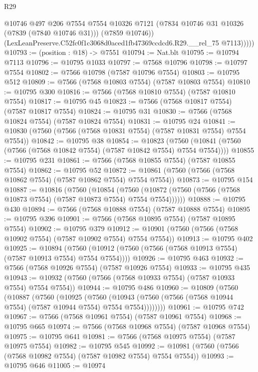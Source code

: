 \begin{lexlean}{R29}
\begin{coremodule}
              @10746
              @497
              @206
              @7554
              @7554
              @10326
              @7121
              (@7834 @10746 @31 @10326 (@7839 (@7840 @10746 @31)))
              (@7859 @10746))
            (LexLeanPreserve.C52fc0f1c3068d0aced1fb47369ccdcd6.R29.__rel_75 @7113)))))
@10793 := (position : @18) -> @7551
@10794 := Nat.blt
@10795 := @10794 @7113
@10796 := @10795 @1033
@10797 := @7568 @10796
@10798 := @10797 @7554
@10802 := @7566 @10798 (@7587 @10796 @7554)
@10803 := @10795 @512
@10809 := @7566 (@7568 @10803 @7554) (@7587 @10803 @7554)
@10810 := @10795 @300
@10816 := @7566 (@7568 @10810 @7554) (@7587 @10810 @7554)
@10817 := @10795 @45
@10823 := @7566 (@7568 @10817 @7554) (@7587 @10817 @7554)
@10824 := @10795 @31
@10830 := @7566 (@7568 @10824 @7554) (@7587 @10824 @7554)
@10831 := @10795 @24
@10841 := @10830 (@7560 (@7566 (@7568 @10831 @7554) (@7587 @10831 @7554) @7554 @7554))
@10842 := @10795 @38
@10854 := @10823
    (@7560 (@10841 (@7560 (@7566 (@7568 @10842 @7554) (@7587 @10842 @7554) @7554 @7554))))
@10855 := @10795 @231
@10861 := @7566 (@7568 @10855 @7554) (@7587 @10855 @7554)
@10862 := @10795 @52
@10872 := @10861 (@7560 (@7566 (@7568 @10862 @7554) (@7587 @10862 @7554) @7554 @7554))
@10873 := @10795 @154
@10887 := @10816
    (@7560
      (@10854
        (@7560 (@10872 (@7560 (@7566 (@7568 @10873 @7554) (@7587 @10873 @7554) @7554 @7554))))))
@10888 := @10795 @430
@10894 := @7566 (@7568 @10888 @7554) (@7587 @10888 @7554)
@10895 := @10795 @396
@10901 := @7566 (@7568 @10895 @7554) (@7587 @10895 @7554)
@10902 := @10795 @379
@10912 := @10901 (@7560 (@7566 (@7568 @10902 @7554) (@7587 @10902 @7554) @7554 @7554))
@10913 := @10795 @402
@10925 := @10894
    (@7560 (@10912 (@7560 (@7566 (@7568 @10913 @7554) (@7587 @10913 @7554) @7554 @7554))))
@10926 := @10795 @463
@10932 := @7566 (@7568 @10926 @7554) (@7587 @10926 @7554)
@10933 := @10795 @435
@10943 := @10932 (@7560 (@7566 (@7568 @10933 @7554) (@7587 @10933 @7554) @7554 @7554))
@10944 := @10795 @486
@10960 := @10809
    (@7560
      (@10887
        (@7560
          (@10925
            (@7560
              (@10943 (@7560 (@7566 (@7568 @10944 @7554) (@7587 @10944 @7554) @7554 @7554))))))))
@10961 := @10795 @742
@10967 := @7566 (@7568 @10961 @7554) (@7587 @10961 @7554)
@10968 := @10795 @665
@10974 := @7566 (@7568 @10968 @7554) (@7587 @10968 @7554)
@10975 := @10795 @641
@10981 := @7566 (@7568 @10975 @7554) (@7587 @10975 @7554)
@10982 := @10795 @545
@10992 := @10981 (@7560 (@7566 (@7568 @10982 @7554) (@7587 @10982 @7554) @7554 @7554))
@10993 := @10795 @646
@11005 := @10974

\end{coremodule}
\end{lexlean}
